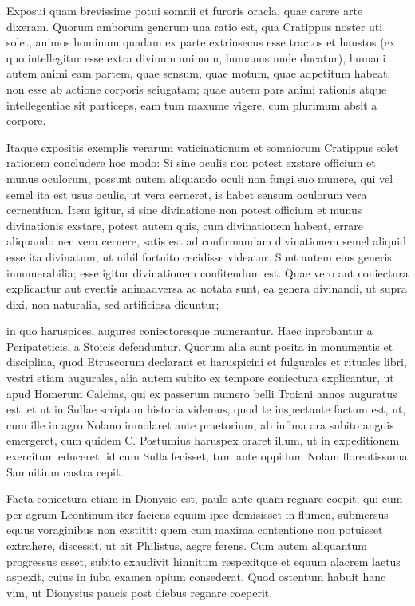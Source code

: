 Exposui quam brevissime potui somnii et furoris oracla, quae carere arte dixeram. Quorum amborum generum una ratio est, qua Cratippus noster uti solet, animos hominum quadam ex parte extrinsecus esse tractos et haustos (ex quo intellegitur esse extra divinum animum, humanus unde ducatur), humani autem animi eam partem, quae sensum, quae motum, quae adpetitum habeat, non esse ab actione corporis seiugatam; quae autem pars animi rationis atque intellegentiae sit particeps, eam tum maxume vigere, cum plurimum absit a corpore.

 Itaque expositis exemplis verarum vaticinationum et somniorum Cratippus solet rationem concludere hoc modo: Si sine oculis non potest exstare officium et munus oculorum, possunt autem aliquando oculi non fungi suo munere, qui vel semel ita est usus oculis, ut vera cerneret, is habet sensum oculorum vera cernentium. Item igitur, si sine divinatione non potest officium et munus divinationis exstare, potest autem quis, cum divinationem habeat, errare aliquando nec vera cernere, satis est ad confirmandam divinationem semel aliquid esse ita divinatum, ut nihil fortuito cecidisse videatur. Sunt autem eius generis innumerabilia; esse igitur divinationem confitendum est. Quae vero aut coniectura explicantur aut eventis animadversa ac notata sunt, ea genera divinandi, ut supra dixi, non naturalia, sed artificiosa dicuntur;

 in quo haruspices, augures coniectoresque numerantur. Haec inprobantur a Peripateticis, a Stoicis defenduntur. Quorum alia sunt posita in monumentis et disciplina, quod Etruscorum declarant et haruspicini et fulgurales et rituales libri, vestri etiam augurales, alia autem subito ex tempore coniectura explicantur, ut apud Homerum Calchas, qui ex passerum numero belli Troiani annos auguratus est, et ut in Sullae scriptum historia videmus, quod te inspectante factum est, ut, cum ille in agro Nolano inmolaret ante praetorium, ab infima ara subito anguis emergeret, cum quidem C. Postumius haruspex oraret illum, ut in expeditionem exercitum educeret; id cum Sulla fecisset, tum ante oppidum Nolam florentissuma Samnitium castra cepit.

 Facta coniectura etiam in Dionysio est, paulo ante quam regnare coepit; qui cum per agrum Leontinum iter faciens equum ipse demisisset in flumen, submersus equus voraginibus non exstitit; quem cum maxima contentione non potuisset extrahere, discessit, ut ait Philistus, aegre ferens. Cum autem aliquantum progressus esset, subito exaudivit hinnitum respexitque et equum alacrem laetus aspexit, cuius in iuba examen apium consederat. Quod ostentum habuit hanc vim, ut Dionysius paucis post diebus regnare coeperit.


